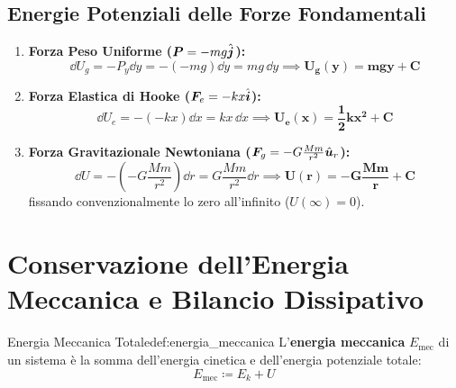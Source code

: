 \subsection{Energie Potenziali delle Forze Fondamentali}

\begin{enumerate}
    \item \textbf{Forza Peso Uniforme ($\bm{P} = -mg\hat{\bm{j}}$):}
    \begin{equation}
        \dd U_g = -P_y \dd y = -(-mg)\dd y = mg\,\dd y \implies \mathbf{U_g(y) = mgy + C}
    \end{equation}
    
    \item \textbf{Forza Elastica di Hooke ($\bm{F}_e = -k x\hat{\bm{i}}$):}
    \begin{equation}
        \dd U_e = -(-k x)\dd x = k x\,\dd x \implies \mathbf{U_e(x) = \frac{1}{2}k x^2 + C}
    \end{equation}
    
    \item \textbf{Forza Gravitazionale Newtoniana ($\bm{F}_g = -G\frac{Mm}{r^2}\hat{\bm{u}}_r$):}
    \begin{equation}
        \dd U = -\left(-G\frac{Mm}{r^2}\right)\dd r = G\frac{Mm}{r^2}\dd r \implies \mathbf{U(r) = -G\frac{Mm}{r} + C}
    \end{equation}
    fissando convenzionalmente lo zero all'infinito ($U(\infty) = 0$).
\end{enumerate}

\section{Conservazione dell'Energia Meccanica e Bilancio Dissipativo}
\label{sec:conservazione_energia}

\begin{definizione}{Energia Meccanica Totale}{def:energia_meccanica}
L'\textbf{energia meccanica} $E_{\text{mec}}$ di un sistema è la somma dell'energia cinetica e dell'energia potenziale totale:
\begin{equation}
    E_{\text{mec}} \coloneqq E_k + U
    \label{eq:e_mec}
\end{equation}
\end{definizione}

